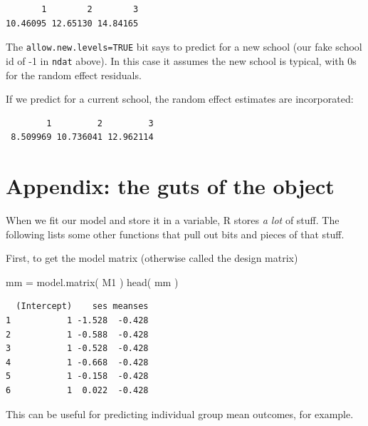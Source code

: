 \documentclass[
  letterpaper,
  DIV=11,
  numbers=noendperiod]{scrreprt}
\newenvironment{Shaded}{}{}
\newcommand{\AttributeTok}[1]{\textcolor[rgb]{0.49,0.56,0.16}{#1}}
\newcommand{\DecValTok}[1]{\textcolor[rgb]{0.25,0.63,0.44}{#1}}
\newcommand{\FunctionTok}[1]{\textcolor[rgb]{0.02,0.16,0.49}{#1}}
\newcommand{\NormalTok}[1]{#1}
\newcommand{\OtherTok}[1]{\textcolor[rgb]{0.00,0.44,0.13}{#1}}
\newcommand{\SpecialCharTok}[1]{\textcolor[rgb]{0.25,0.44,0.63}{#1}}
\begin{document}
\begin{verbatim}
       1        2        3 
10.46095 12.65130 14.84165 
\end{verbatim}

The \texttt{allow.new.levels=TRUE} bit says to predict for a new school
(our fake school id of -1 in \texttt{ndat} above). In this case it
assumes the new school is typical, with 0s for the random effect
residuals.

If we predict for a current school, the random effect estimates are
incorporated:

\begin{Shaded}
\end{Shaded}

\begin{verbatim}
        1         2         3 
 8.509969 10.736041 12.962114 
\end{verbatim}

\section{Appendix: the guts of the
object}\label{appendix-the-guts-of-the-object}

When we fit our model and store it in a variable, R stores \emph{a lot}
of stuff. The following lists some other functions that pull out bits
and pieces of that stuff.

First, to get the model matrix (otherwise called the design matrix)

\begin{Shaded}
\begin{Highlighting}[]
\NormalTok{mm }\OtherTok{=} \FunctionTok{model.matrix}\NormalTok{( M1 )}
\FunctionTok{head}\NormalTok{( mm )}
\end{Highlighting}
\end{Shaded}

\begin{verbatim}
  (Intercept)    ses meanses
1           1 -1.528  -0.428
2           1 -0.588  -0.428
3           1 -0.528  -0.428
4           1 -0.668  -0.428
5           1 -0.158  -0.428
6           1  0.022  -0.428
\end{verbatim}

This can be useful for predicting individual group mean outcomes, for
example.
\end{document}
